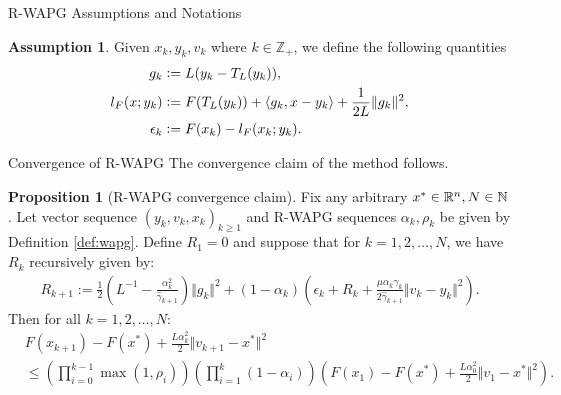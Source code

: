 \documentclass[11pt]{beamer}
\theoremstyle{definition}
\newtheorem{assumption}{Assumption}[section]
\newtheorem{proposition}{Proposition}[section]
\begin{document}
        \begin{frame}{R-WAPG Assumptions and Notations}
            \begin{assumption}\label{ass:regret-gap}
                Given $x_k, y_k, v_k$ where $k \in \mathbb Z_+$, we define the following quantities
                \begin{align}
                    g_k &\vcentcolon= L(y_k - T_L(y_k)), 
                    \label{eqn:grad-map}
                    \\
                    l_F(x; y_k) &\vcentcolon= F(T_L(y_k)) + \langle g_k, x - y_k\rangle + \frac{1}{2L}\Vert g_k\Vert^2, 
                    \label{eqn:lower-linearization}
                    \\
                    \epsilon_{k} &\vcentcolon= F(x_k) - l_F(x_k; y_k). 
                    \label{eqn:regret}
                \end{align}
            \end{assumption}
        \end{frame}
        \begin{frame}{Convergence of R-WAPG}
            The convergence claim of the method follows. 
            \begin{proposition}[R-WAPG convergence claim]\label{prop:wagp-convergence}
                Fix any arbitrary $x^* \in \mathbb R^n, N \in \mathbb N$. 
                Let vector sequence $(y_k, v_{k}, x_{k})_{k \ge 1}$ and R-WAPG sequences $\alpha_k, \rho_k$ be given by Definition \ref{def:wapg}. 
                Define $R_1 = 0$ and suppose that for $k = 1, 2, \ldots, N$, we have $R_k$ recursively given by: 
                {\scriptsize
                \begin{align*}
                    R_{k + 1}
                    := 
                    \frac{1}{2}\left(
                        L^{-1} - \frac{\alpha_k^2}{\hat \gamma_{k + 1}}
                    \right)\Vert g_k\Vert^2
                    + 
                    (1 - \alpha_k)
                    \left(
                        \epsilon_k + R_k + 
                        \frac{\mu\alpha_k\gamma_k}{2\hat \gamma_{k + 1}}
                        \Vert v_k - y_k\Vert^2
                    \right). 
                \end{align*}
                }
                Then for all $k = 1, 2, \ldots, N$: 
                {\scriptsize
                \begin{align*}
                    & F(x_{k + 1}) - F(x^*) + \frac{L \alpha_k^2}{2}\Vert v_{k + 1} - x^*\Vert^2
                    \\
                    &\le 
                    \left(
                        \prod_{i = 0}^{k - 1} \max(1, \rho_{i})
                    \right)
                    \left(
                        \prod_{i = 1}^{k} \left(1  - \alpha_i\right)
                    \right)
                    \left(
                        F(x_1) - F(x^*) + \frac{L\alpha_0^2}{2}\Vert v_1 - x^*\Vert^2
                    \right). 
                \end{align*}
                }
            \end{proposition}
        \end{frame}
\end{document}
